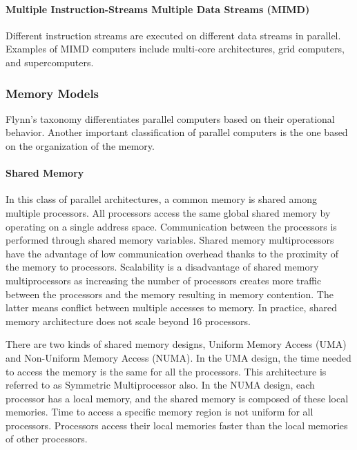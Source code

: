 \paragraph{Multiple Instruction-Streams Multiple Data Streams (MIMD)} Different instruction streams are executed on different data streams in parallel. Examples of MIMD computers include multi-core architectures, grid computers, and supercomputers.

\subsubsection{Memory Models}

Flynn's taxonomy differentiates parallel computers based on their operational behavior. Another important classification of parallel computers is the one based on the organization of the memory.

\paragraph{Shared Memory}

In this class of parallel architectures, a common memory is shared among multiple processors. All processors access the same global shared memory by operating on a single address space. Communication between the processors is performed through shared memory variables. Shared memory multiprocessors have the advantage of low communication overhead thanks to the proximity of the memory to processors. Scalability is a disadvantage of shared memory multiprocessors as increasing the number of processors creates more traffic between the processors and the memory resulting in memory contention. The latter means conflict between multiple accesses to memory. In practice, shared memory architecture does not scale beyond 16 processors.  

There are two kinds of shared memory designs, Uniform Memory Access (UMA) and Non-Uniform Memory Access (NUMA). In the UMA design, the time needed to access the memory is the same for all the processors. This architecture is referred to as Symmetric Multiprocessor also. In the NUMA design, each processor has a local memory, and the shared memory is composed of these local memories. Time to access a specific memory region is not uniform for all processors. Processors access their local memories faster than the local memories of other processors.

